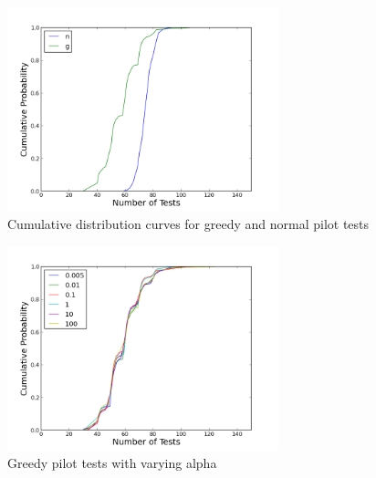 \documentclass{article}
\begin{document}
\begin{figure}[h]
\centering
\includegraphics[width=0.7\textwidth]{greedyvnormal.png}
\caption{Cumulative distribution curves for greedy and normal pilot tests}
\end{figure}

\begin{figure}[h]
\centering
\includegraphics[width=0.7\textwidth]{manyalphagreedychoice.png}
\caption{Greedy pilot tests with varying alpha}
\end{figure}
\end{document}
